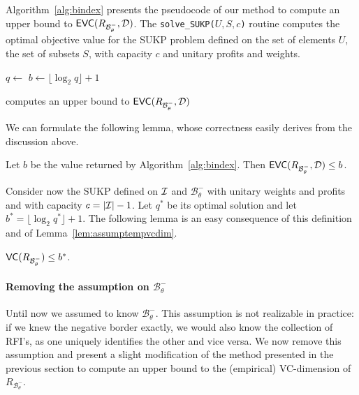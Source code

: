 
Algorithm~\ref{alg:bindex} presents the pseudocode of
our method to compute an upper bound to $\mathsf{EVC}(R_{\mathcal{B}^-_\theta},{\cal D})$.
The \texttt{solve\_SUKP($U,S,c$)} routine computes the optimal objective value for
the SUKP problem defined on the set of elements $U$, the set of subsets $S$,
with capacity $c$ and unitary profits and weights. 
\begin{algorithm}[ht]
   \DontPrintSemicolon
   {
  $q\leftarrow$ \;
  $b\leftarrow\lfloor\log_2q\rfloor+1$\;
   {
  \;
  }
  }
  \caption{computes an upper bound to $\mathsf{EVC}(R_{\mathcal{B}^-_\theta},{\cal D})$}\label{alg:bindex}
\end{algorithm}

We can formulate the following lemma, whose correctness easily derives from
the discussion above.
\begin{lemma}\label{lem:assumptempvcdim}
  Let $b$ be the value returned by Algorithm~\ref{alg:bindex}. Then
  $\mathsf{EVC}(R_{\mathcal{B}^-_\theta},{\cal D})\le b$.
\end{lemma}

Consider now the SUKP defined on ${\cal I}$ and
$\mathcal{B}^-_\theta$ with unitary weights and profits and with capacity
$c=|{\cal I}|-1$. Let $q^*$ be its optimal solution and let
$b^*=\lfloor\log_2q^*\rfloor+1$. The following lemma is an easy consequence of
this definition and of
Lemma~\ref{lem:assumptempvcdim}.

\begin{lemma}\label{lem:assmptvcdim}
  $\mathsf{VC}(R_{\mathcal{B}^-_\theta})\le b^*$.
\end{lemma}

\paragraph{Removing the assumption on $\mathcal{B}^-_\theta$}
Until now we assumed to know $\mathcal{B}^-_\theta$. This assumption is not
realizable in practice: if we knew the negative border exactly, we would also
know the collection of RFI's, as one uniquely identifies the other and
vice versa. We now remove this assumption and present a slight modification of
the method presented in the previous section to compute an upper bound to the
(empirical) VC-dimension of $R_{\mathcal{B}^-_\theta}$.

